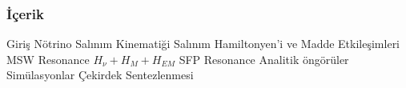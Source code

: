 \documentclass[10pt]{beamer}
\begin{document}
\begin{frame}
    \frametitle{İçerik}
    \begin{outline}
        \1[\checkmark] Giriş
        \1[\checkmark] Nötrino Salınım Kinematiği
        \1[\checkmark] Salınım Hamiltonyen'i ve Madde Etkileşimleri
        \2[\textendash] MSW Resonance
        \1[\checkmark] $H_{\nu}+ H_{M}+ H_{EM}$
        \2[\textendash] SFP Resonance
        \1[\textbullet] Analitik öngörüler
        \1[\textbullet] Simülasyonlar
        \1[\textbullet] Çekirdek Sentezlenmesi
    \end{outline}
\end{frame}


%
\end{document}
